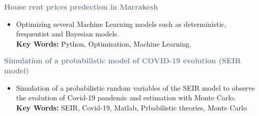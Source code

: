 \documentclass[10pt,a4paper,ragged2e]{altacv}
\begin{document}
\textcolor{SlateGrey}{\textbf{House rent prices predection in Marrakesh}}
\newline

\begin{itemize}
    \item Optimizing several Machine Learning models such as deterministic, frequentist and Bayesian models.\\
    { \textbf{Key Words:} Python, Optimisation, Machine Learning.}
\end{itemize}


\textcolor{SlateGrey}{\textbf{ Simulation of a probabilistic model of COVID-19 evolution (SEIR model)}}
\newline

\begin{itemize}
    \item Simulation of a probabilistic random variables of the SEIR model to observe the evolution of Covid-19 pandemic and estimation with Monte Carlo.\\
   {\textbf{Key Words:} SEIR, Covid-19, Matlab, Prbabilistic theories, Monte Carlo}
\end{itemize}






\clearpage
\end{document}
